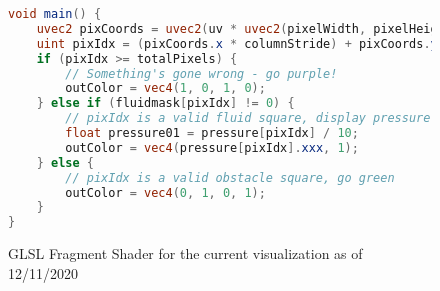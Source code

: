 \begin{figure}[ht]
    \centering
    \begin{lstlisting}[language=glsl]
void main() {
    uvec2 pixCoords = uvec2(uv * uvec2(pixelWidth, pixelHeight));
    uint pixIdx = (pixCoords.x * columnStride) + pixCoords.y;
    if (pixIdx >= totalPixels) {
        // Something's gone wrong - go purple!
        outColor = vec4(1, 0, 1, 0);
    } else if (fluidmask[pixIdx] != 0) {
        // pixIdx is a valid fluid square, display pressure
        float pressure01 = pressure[pixIdx] / 10;
        outColor = vec4(pressure[pixIdx].xxx, 1);
    } else {
        // pixIdx is a valid obstacle square, go green
        outColor = vec4(0, 1, 0, 1);
    }
}
\end{lstlisting}
    \caption{GLSL Fragment Shader for the current visualization as of 12/11/2020}
    \label{fig:SimPressureShader}
\end{figure}